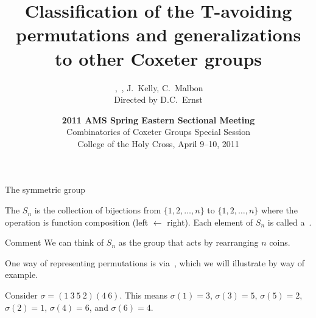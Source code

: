 \documentclass[9pt]{beamer}
\begin{document}

\title[Classification of the T-avoiding permutations]{\textbf{Classification of the T-avoiding permutations and generalizations to other Coxeter groups}}
\author[Cormier, Ernst, Goldenberg, Kelly, Malbon]{\,, \,, J.~Kelly, C.~Malbon\\
Directed by D.C.~Ernst}

\date[April 10, 2011]{{\bf 2011 AMS Spring Eastern Sectional Meeting}\\
Combinatorics of Coxeter Groups Special Session\\
College of the Holy Cross, April 9--10, 2011}

\frame{\titlepage}


\begin{frame}{The symmetric group} 

\begin{definition}
The  $S_{n}$ is the collection of bijections from $\{1,2, \ldots, n\}$ to $\{1, 2, \dots, n\}$ where the operation is function composition (left $\leftarrow$ right).  Each element of $S_{n}$ is called a \,.
\end{definition}

\begin{block}{Comment}
We can think of $S_{n}$ as the group that acts by rearranging $n$ coins.
\end{block}

\medskip

One way of representing permutations is via \,, which we will illustrate by way of example.

\begin{example}
Consider $\sigma=(1\ 3\ 5\ 2)(4\ 6)$.  This means $\sigma(1)=3$, $\sigma(3)=5$, $\sigma(5)=2$, $\sigma(2)=1$, $\sigma(4)=6$, and $\sigma(6)=4$.
\end{example}

\end{frame}

\end{document}
